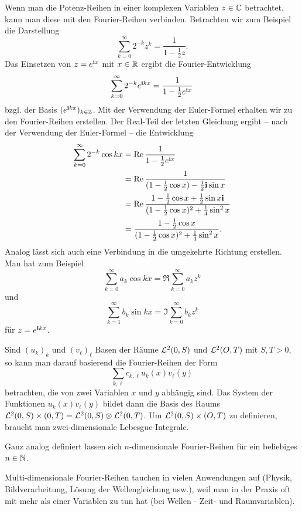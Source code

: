 \begin{bem}
	Wenn man die Potenz-Reihen in einer komplexen Variablen $z \in \mathbb{C}$ betrachtet, kann man diese mit den Fourier-Reihen verbinden. Betrachten wir zum Beispiel die Darstellung 
	\[
			\sum_{k=0}^\infty 2^{-k} z^k = \frac{1}{1 - \frac{1}{2} z}. 
	\]
	Das Einsetzen von $z = e^{\mathbf{i} x}$ mit $x \in \mathbb{R}$ ergibt die Fourier-Entwicklung 
	\[
			\sum_{k=0}^\infty 2^{-k} e^{\mathbf{i} k x} = \frac{1}{1 - \frac{1}{2} e^{\mathbf{i} x}}
	\]
	bzgl. der Basis $(e^{\mathbf{i} k x} )_{k \in \mathbb{Z}}$. Mit der Verwendung der Euler-Formel erhalten wir 
	zu den Fourier-Reihen erstellen. Der Real-Teil der letzten Gleichung ergibt --  nach der Verwendung der Euler-Formel -- die Entwicklung 
	\begin{align*}
		\sum_{k=0}^\infty 2^{-k} \cos k x  & = \operatorname{Re} \frac{1}{1 - \frac{1}{2} e^{\mathbf{i} x}}
		\\ & = \operatorname{Re} \frac{1}{ (1 - \frac{1}{2} \cos x)  - \frac{1}{2} \mathbf{i} \sin x}
		\\ & = \operatorname{Re} \frac{1- \frac{1}{2} \cos x + \frac{1}{2} \sin x \mathbf{i}}{(1-\frac{1}{2} \cos x)^2 + \frac{1}{4} \sin^2 x}
		\\ & = \frac{1 - \frac{1}{2} \cos x}{(1- \frac{1}{2} \cos x )^2 + \frac{1}{4} \sin^2 x}. 
	\end{align*} 
	Analog lässt  sich auch eine Verbindung in die umgekehrte Richtung erstellen.  Man hat zum Beispiel 
	\[
		\sum_{k=0}^\infty a_k \cos k x = \Re \sum_{k=0}^\infty a_k z^k
	\]
	und 
	\[
		\sum_{k=1}^\infty b_k \sin k x = \Im \sum_{k=0}^\infty b_k z^k
	\]
	für $z = e^{\mathbf{i} k x}$. 
\end{bem} 

\begin{bem}
	Sind $(u_k)_k$ und $(v_\ell)_\ell$ Basen der Räume $\mathcal{L}^2(0,S)$ und $\mathcal{L}^2(O,T)$ mit $S,T>0$, so kann man darauf basierend die Fourier-Reihen der Form 
	\[
			\sum_{k,\ell} c_{k,\ell} u_k(x) v_\ell(y) 
	\]
	betrachten, die von zwei Variablen $x$ und $y$ abhängig sind. Das System der Funktionen $u_k(x) v_\ell(y)$ bildet dann die Basis des Raums $\mathcal{L}^2(0,S) \times (0,T) = \mathcal{L}^2 (0,S) \otimes \mathcal{L}^2(0,T)$. Um $\mathcal{L}^2(0,S) \times (O,T)$ zu definieren, braucht man zwei-dimensionale Lebesgue-Integrale. 
	
	Ganz analog definiert lassen sich $n$-dimensionale Fourier-Reihen für ein beliebiges $n \in \mathbb{N}$. 
	
	Multi-dimensionale Fourier-Reihen tauchen in vielen Anwendungen auf (Physik, Bildverarbeitung, Lösung der Wellengleichung usw.), weil man in der Praxis oft mit mehr als einer Variablen zu tun hat (bei Wellen - Zeit- und Raumvariablen). 
\end{bem} 

